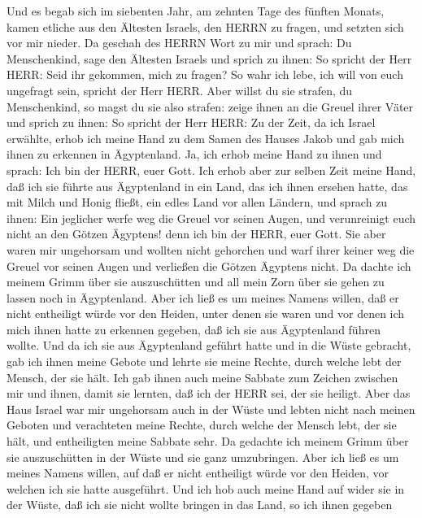  Und es begab sich im siebenten Jahr, am zehnten Tage des
fünften Monats, kamen etliche aus den Ältesten Israels, den HERRN zu
fragen, und setzten sich vor mir nieder.  Da geschah des
HERRN Wort zu mir und sprach:  Du Menschenkind, sage den
Ältesten Israels und sprich zu ihnen: So spricht der Herr HERR: Seid ihr
gekommen, mich zu fragen? So wahr ich lebe, ich will von euch ungefragt
sein, spricht der Herr HERR.  Aber willst du sie strafen, du
Menschenkind, so magst du sie also strafen: zeige ihnen an die Greuel
ihrer Väter  und sprich zu ihnen: So spricht der Herr HERR:
Zu der Zeit, da ich Israel erwählte, erhob ich meine Hand zu dem Samen
des Hauses Jakob und gab mich ihnen zu erkennen in Ägyptenland. Ja, ich
erhob meine Hand zu ihnen und sprach: Ich bin der HERR, euer Gott.
 Ich erhob aber zur selben Zeit meine Hand, daß ich sie
führte aus Ägyptenland in ein Land, das ich ihnen ersehen hatte, das mit
Milch und Honig fließt, ein edles Land vor allen Ländern, 
und sprach zu ihnen: Ein jeglicher werfe weg die Greuel vor seinen
Augen, und verunreinigt euch nicht an den Götzen Ägyptens! denn ich bin
der HERR, euer Gott.  Sie aber waren mir ungehorsam und
wollten nicht gehorchen und warf ihrer keiner weg die Greuel vor seinen
Augen und verließen die Götzen Ägyptens nicht. Da dachte ich meinem
Grimm über sie auszuschütten und all mein Zorn über sie gehen zu lassen
noch in Ägyptenland.  Aber ich ließ es um meines Namens
willen, daß er nicht entheiligt würde vor den Heiden, unter denen sie
waren und vor denen ich mich ihnen hatte zu erkennen gegeben, daß ich
sie aus Ägyptenland führen wollte.  Und da ich sie aus
Ägyptenland geführt hatte und in die Wüste gebracht,  gab
ich ihnen meine Gebote und lehrte sie meine Rechte, durch welche lebt
der Mensch, der sie hält.  Ich gab ihnen auch meine Sabbate
zum Zeichen zwischen mir und ihnen, damit sie lernten, daß ich der HERR
sei, der sie heiligt.  Aber das Haus Israel war mir
ungehorsam auch in der Wüste und lebten nicht nach meinen Geboten und
verachteten meine Rechte, durch welche der Mensch lebt, der sie hält,
und entheiligten meine Sabbate sehr. Da gedachte ich meinem Grimm über
sie auszuschütten in der Wüste und sie ganz umzubringen. 
Aber ich ließ es um meines Namens willen, auf daß er nicht entheiligt
würde vor den Heiden, vor welchen ich sie hatte ausgeführt.
 Und ich hob auch meine Hand auf wider sie in der Wüste,
daß ich sie nicht wollte bringen in das Land, so ich ihnen gegeben
